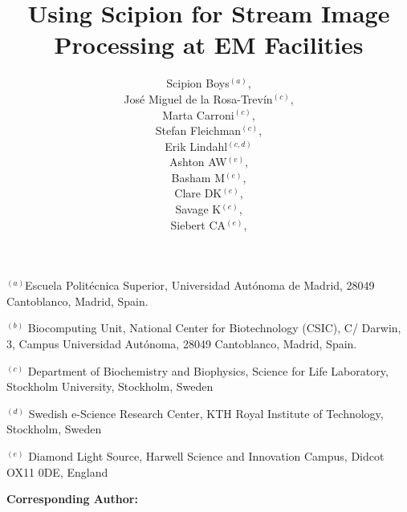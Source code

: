 \documentclass[12pt]{article}
\newcommand{\lyxaddress}[1]{
   \par {\raggedright #1
   \vspace{1.4em}
   \noindent\par}
}
\begin{document}
\title{Using Scipion for Stream Image Processing at EM Facilities}
\author{Scipion Boys$^{(a)}$,\\
Jos\'e Miguel de la Rosa-Trev\'{i}n$^{(c)}$,\\
Marta Carroni$^{(c)}$,\\
Stefan Fleichman$^{(c)}$,\\
Erik Lindahl$^{(c,d)}$\\
Ashton AW$^{(e)}$,\\
Basham M$^{(e)}$,\\
Clare DK$^{(e)}$,\\
Savage K$^{(e)}$,\\
Siebert CA$^{(e)}$,\\
        }

\maketitle

\lyxaddress{{\small \vspace{-0.5cm}$^{(a)}$Escuela Polit\'{e}cnica Superior, Universidad Aut\'{o}noma de Madrid, 28049 Cantoblanco, Madrid, Spain.}}
\lyxaddress{{\small$^{(b)}$ Biocomputing Unit, National Center for Biotechnology (CSIC), C/ Darwin, 3, Campus Universidad Aut\'{o}noma, 28049 Cantoblanco, Madrid, Spain.}}
\lyxaddress{{\small$^{(c)}$ Department of Biochemistry and Biophysics, Science for Life Laboratory, Stockholm University, Stockholm, Sweden}} 
\lyxaddress{{\small$^{(d)}$ Swedish e-Science Research Center, KTH Royal Institute of Technology, Stockholm, Sweden}}
\lyxaddress{{\small$^{(e)}$ Diamond Light Source, Harwell Science and Innovation Campus, Didcot OX11 0DE, England}}
\setcounter{figure}{2}%
\textbf{Corresponding Author:} %

\newpage







\appendix




\clearpage
%

\newpage
%
%
\end{document}
